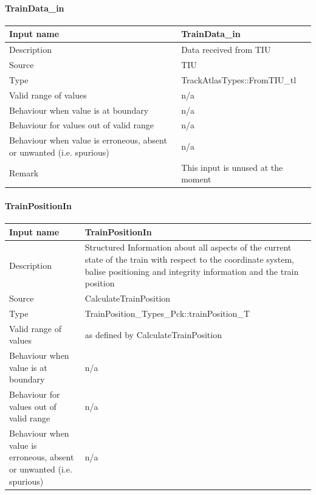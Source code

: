 \paragraph{TrainData\_in}

\begin{longtable}{p{}p{}}
\toprule
Input name				& TrainData\_in\\
\midrule
Description				& Data received from TIU\\
\midrule
Source					& TIU \\ 
\midrule
Type					& TrackAtlasTypes::FromTIU\_tl \\
\midrule
Valid range of values	& n/a\\
\midrule
Behaviour when value is at boundary	& n/a\\
\midrule
Behaviour for values out of valid range	& n/a\\
\midrule
Behaviour when value is erroneous, absent or unwanted (i.e. spurious) & n/a\\
\midrule
Remark & This input is unused at the moment\\

\bottomrule
\end{longtable}

\paragraph{TrainPositionIn}

\begin{longtable}{p{}p{}}
\toprule
Input name				& TrainPositionIn\\
\midrule
Description				& Structured Information about all aspects of the current state of the train with respect to the coordinate system, balise positioning and integrity information and the train position\\
\midrule
Source					& CalculateTrainPosition \\ 
\midrule
Type					& TrainPosition\_Types\_Pck::trainPosition\_T \\
\midrule
Valid range of values	& as defined by CalculateTrainPosition \\
\midrule
Behaviour when value is at boundary	& n/a\\
\midrule
Behaviour for values out of valid range	& n/a\\
\midrule
Behaviour when value is erroneous, absent or unwanted (i.e. spurious) & n/a\\
\bottomrule
\end{longtable}

